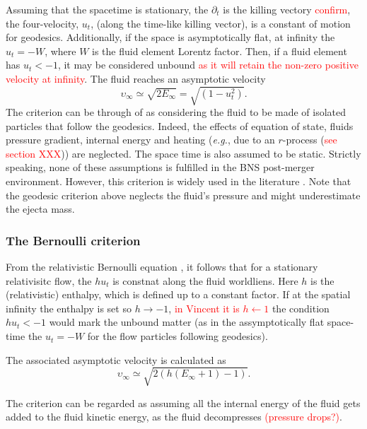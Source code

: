 \documentclass[11pt,a4paper,headinclude=true,DIV=14,BCOR=8mm,chapterprefix,listof=totoc,twoside,openright,abstracton]{scrbook}
\newcommand{\red}[1]{\textcolor{red}{#1}}
\newcommand{\eg}{\textit{e.g.}}
\begin{document}
Assuming that the spacetime is stationary, the $\partial_t$ is the killing vectory \red{confirm}, 
the four-velocity, $u_t$, (along the time-like killing vector), is a constant of motion for geodesics. 
Additionally, if the space is asymptotically flat, at infinity the $u_t = -W$, where $W$ is the fluid element Lorentz factor. Then, if a fluid element has $u_t < -1$, it may be considered unbound \red{as it will retain the non-zero positive velocity at infinity}. 
The fluid reaches an asymptotic velocity 
\begin{equation}
    \upsilon_{\infty} \simeq \sqrt{2E_{\infty}} = \sqrt{(1-u_t ^2)}.
\end{equation}
The criterion can be through of as considering the fluid to be made of isolated particles that follow the geodesics. Indeed, the effects of equation of state, fluids pressure gradient, internal energy and heating (\eg, due to an $r$-process (\red{see section XXX})) are neglected. The space time is also assumed to be static.
Strictly speaking, none of these assumptions is fulfilled in the BNS post-merger environment. However, this criterion is widely used in the literature \citep[\eg][]{Radice:2018pdn,Vincent:2019kor}.
Note that the geodesic criterion above neglects the fluid's pressure and might underestimate the ejecta mass.

\subsubsection{The Bernoulli criterion}

From the relativistic Bernoulli equation \citep{Rezzolla:2013}, it follows
that for a stationary relativisitc flow, the $hu_t$ is constnat along the 
fluid worldliens. Here $h$ is the (relativistic) enthalpy, which is
defined up to a constant factor. 
If at the spatial infinity the enthalpy is set so $h\rightarrow-1$, 
\red{in Vincent it is $h\leftarrow 1$}
the condition $hu_t < -1$ would mark the unbound matter 
(as in the assymptotically flat space-time the $u_t = -W$ for the flow particles following geodesics).

The associated asymptotic velocity is calculated as 
\begin{equation}
    \upsilon_{\infty} \simeq \sqrt{2 (h (E_{\infty}+1)-1)}. 
\end{equation}

The criterion can be regarded as assuming all the internal energy of the fluid 
gets added to the fluid kinetic energy, as the fluid decompresses \red{(pressure drops?)}.
\end{document}
